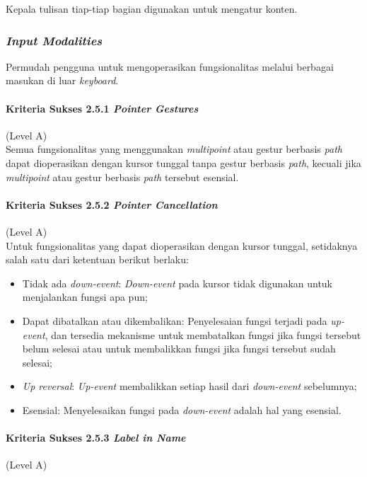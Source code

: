Kepala tulisan tiap-tiap bagian digunakan untuk mengatur konten.

\subsubsection{\textit{Input Modalities}}
\label{sec:input_modalities}
Permudah pengguna untuk mengoperasikan fungsionalitas melalui berbagai masukan di luar \textit{keyboard}.

\paragraph{Kriteria Sukses 2.5.1 \textit{Pointer Gestures}}
\label{sec:kriteria_sukses_2.5.1}
(Level A)\\

Semua fungsionalitas yang menggunakan \textit{multipoint} atau gestur berbasis \textit{path} dapat dioperasikan dengan kursor tunggal tanpa gestur berbasis \textit{path}, kecuali jika \textit{multipoint} atau gestur berbasis \textit{path} tersebut esensial.

\paragraph{Kriteria Sukses 2.5.2 \textit{Pointer Cancellation}}
\label{sec:kriteria_sukses_2.5.2}
(Level A)\\

Untuk fungsionalitas yang dapat dioperasikan dengan kursor tunggal, setidaknya salah satu dari ketentuan berikut berlaku:
\begin{itemize}
	\item Tidak ada \textit{down-event}: \textit{Down-event} pada kursor tidak digunakan untuk menjalankan fungsi apa pun;
	\item Dapat dibatalkan atau dikembalikan: Penyelesaian fungsi terjadi pada \textit{up-event}, dan tersedia mekanisme untuk membatalkan fungsi jika fungsi tersebut belum selesai atau untuk membalikkan fungsi jika fungsi tersebut sudah selesai;
	\item \textit{Up reversal}: \textit{Up-event} membalikkan setiap hasil dari \textit{down-event} sebelumnya;
	\item Esensial: Menyelesaikan fungsi pada \textit{down-event} adalah hal yang esensial.
\end{itemize}

\paragraph{Kriteria Sukses 2.5.3 \textit{Label in Name}}
\label{sec:kriteria_sukses_2.5.3}
(Level A)\\

